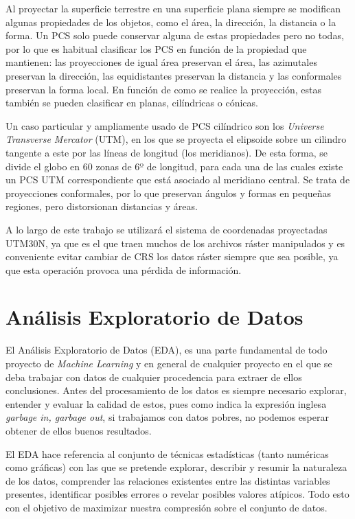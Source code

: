 \documentclass[12pt,a4paper,]{book}
\numberwithin{dummy}{section}
\theoremstyle{ocrenumbox}
\theoremstyle{blacknumex}
\theoremstyle{blacknumbox}
\theoremstyle{ocrenum}
\theoremstyle{ocrenum}
\begin{document}
Al proyectar la superficie terrestre en una superficie plana siempre se
modifican algunas propiedades de los objetos, como el área, la
dirección, la distancia o la forma. Un PCS solo puede conservar alguna
de estas propiedades pero no todas, por lo que es habitual clasificar
los PCS en función de la propiedad que mantienen: las proyecciones de
igual área preservan el área, las azimutales preservan la dirección, las
equidistantes preservan la distancia y las conformales preservan la
forma local. En función de como se realice la proyección, estas también
se pueden clasificar en planas, cilíndricas o cónicas.

Un caso particular y ampliamente usado de PCS cilíndrico son los
\emph{Universe Transverse Mercator} (UTM), en los que se proyecta el
elipsoide sobre un cilindro tangente a este por las líneas de longitud
(los meridianos). De esta forma, se divide el globo en 60 zonas de 6º de
longitud, para cada una de las cuales existe un PCS UTM correspondiente
que está asociado al meridiano central. Se trata de proyecciones
conformales, por lo que preservan ángulos y formas en pequeñas regiones,
pero distorsionan distancias y áreas.

A lo largo de este trabajo se utilizará el sistema de coordenadas
proyectadas UTM30N, ya que es el que traen muchos de los archivos ráster
manipulados y es conveniente evitar cambiar de CRS los datos ráster
siempre que sea posible, ya que esta operación provoca una pérdida de
información.

\hypertarget{anuxe1lisis-exploratorio-de-datos}{%
\section{Análisis Exploratorio de
Datos}\label{anuxe1lisis-exploratorio-de-datos}}

El Análisis Exploratorio de Datos (EDA), es una parte fundamental de
todo proyecto de \emph{Machine Learning} y en general de cualquier
proyecto en el que se deba trabajar con datos de cualquier procedencia
para extraer de ellos conclusiones. Antes del procesamiento de los datos
es siempre necesario explorar, entender y evaluar la calidad de estos,
pues como indica la expresión inglesa \emph{garbage in, garbage out}, si
trabajamos con datos pobres, no podemos esperar obtener de ellos buenos
resultados. \citep{wickham2016r}

El EDA hace referencia al conjunto de técnicas estadísticas (tanto
numéricas como gráficas) con las que se pretende explorar, describir y
resumir la naturaleza de los datos, comprender las relaciones existentes
entre las distintas variables presentes, identificar posibles errores o
revelar posibles valores atípicos. Todo esto con el objetivo de
maximizar nuestra compresión sobre el conjunto de datos.
\end{document}
